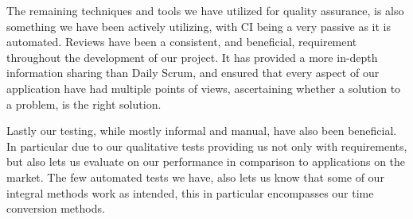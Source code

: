 The remaining techniques and tools we have utilized for quality assurance, is also something we have been actively utilizing, with \ac{CI} being a very passive as it is automated.
Reviews have been a consistent, and beneficial, requirement throughout the development of our project.
It has provided a more in-depth information sharing than Daily Scrum, and ensured that every aspect of our application have had multiple points of views, ascertaining whether a solution to a problem, is the right solution.

Lastly our testing, while mostly informal and manual, have also been beneficial.
In particular due to our qualitative tests providing us not only with requirements, but also lets us evaluate on our performance in comparison to applications on the market.
The few automated tests we have, also lets us know that some of our integral methods work as intended, this in particular encompasses our time conversion methods.




